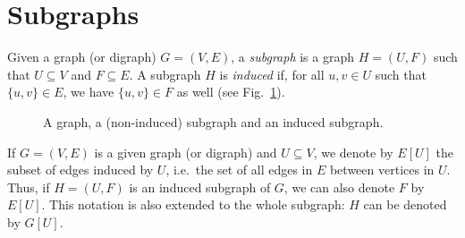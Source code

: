 \documentclass[a4paper]{book}
\theoremstyle{changebreak}                %
\begin{document}
\section{Subgraphs}
\label{s:graph:subgraph}
Given a graph (or digraph) $G=(V,E)$, a {\it subgraph}
is a graph $H=(U,F)$ such that $U\subseteq V$ and $F\subseteq E$. A
subgraph $H$ is {\it induced} if, for all
$u,v\in U$ such that $\{u,v\}\in E$, we have $\{u,v\}\in F$ as well
(see Fig.~\ref{f:subgraph}).
\begin{figure}[!ht]
\begin{center}
\begin{minipage}{4cm}
\end{minipage}
\hspace*{0.5cm}
\begin{minipage}{4cm}
\end{minipage}
\hspace*{0.5cm}
\begin{minipage}{4cm}
\end{minipage}
\end{center}
\caption{A graph, a (non-induced) subgraph and an induced subgraph.}
\label{f:subgraph}
\end{figure}
If $G=(V,E)$ is a given graph (or digraph) and $U\subseteq V$, we
denote by $E[U]$ the subset of edges induced by $U$,
i.e.~the set of all edges in $E$ between vertices in $U$. Thus, if
$H=(U,F)$ is an induced subgraph of $G$, we can also denote $F$ by
$E[U]$. This notation is also extended to the whole subgraph: $H$ can
be denoted by $G[U]$.
\end{document}
